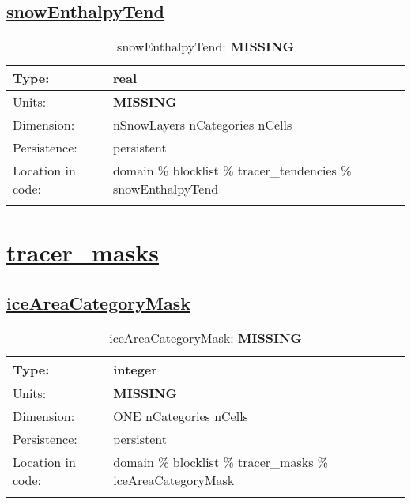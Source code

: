 \subsection[snowEnthalpyTend]{\hyperref[sec:var_tab_tracer_tendencies]{snowEnthalpyTend}}
\label{subsec:var_sec_tracer_tendencies_snowEnthalpyTend}
\begin{center}
\begin{longtable}{| p{2.0in} | p{4.0in} |}
        \hline 
        Type: & real \\
        \hline 
        Units: & {\bf \color{red} MISSING} \\
        \hline 
        Dimension: & nSnowLayers nCategories nCells \\
        \hline 
        Persistence: & persistent \\
        \hline 
         Location in code: & domain \% blocklist \% tracer\_tendencies \% snowEnthalpyTend \\
         \hline 
    \caption{snowEnthalpyTend: {\bf \color{red} MISSING}}
\end{longtable}
\end{center}
\section[tracer\_masks]{\hyperref[sec:var_tab_tracer_masks]{tracer\_masks}}
\label{sec:var_sec_tracer_masks}
\subsection[iceAreaCategoryMask]{\hyperref[sec:var_tab_tracer_masks]{iceAreaCategoryMask}}
\label{subsec:var_sec_tracer_masks_iceAreaCategoryMask}
\begin{center}
\begin{longtable}{| p{2.0in} | p{4.0in} |}
        \hline 
        Type: & integer \\
        \hline 
        Units: & {\bf \color{red} MISSING} \\
        \hline 
        Dimension: & ONE nCategories nCells \\
        \hline 
        Persistence: & persistent \\
        \hline 
         Location in code: & domain \% blocklist \% tracer\_masks \% iceAreaCategoryMask \\
         \hline 
    \caption{iceAreaCategoryMask: {\bf \color{red} MISSING}}
\end{longtable}
\end{center}
